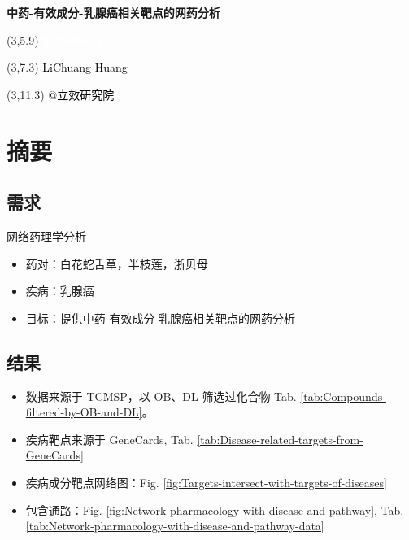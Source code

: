 \documentclass[
]{article}
\author{}
\date{\vspace{-2.5em}}
\providecommand{\tightlist}{%
  \setlength{\itemsep}{0pt}\setlength{\parskip}{0pt}}
\begin{document}
\begin{titlepage} 
\begin{center} \textbf{\Huge
中药-有效成分-乳腺癌相关靶点的网药分析}
\vspace{4em} \begin{textblock}{10}(3,5.9) \huge
\textbf{\textcolor{white}{2024-04-17}}
\end{textblock} \begin{textblock}{10}(3,7.3)
\Large \textcolor{black}{LiChuang Huang}
\end{textblock} \begin{textblock}{10}(3,11.3)
\Large \textcolor{black}{@立效研究院}
\end{textblock} \end{center} \end{titlepage}
\restoregeometry


\tableofcontents

\listoffigures

\listoftables

\newpage


\hypertarget{abstract}{%
\section{摘要}\label{abstract}}

\hypertarget{ux9700ux6c42}{%
\subsection{需求}\label{ux9700ux6c42}}

网络药理学分析

\begin{itemize}
\tightlist
\item
  药对：白花蛇舌草，半枝莲，浙贝母
\item
  疾病：乳腺癌
\item
  目标：提供中药-有效成分-乳腺癌相关靶点的网药分析
\end{itemize}

\hypertarget{ux7ed3ux679c}{%
\subsection{结果}\label{ux7ed3ux679c}}

\begin{itemize}
\tightlist
\item
  数据来源于 TCMSP，以 OB、DL 筛选过化合物 Tab. \ref{tab:Compounds-filtered-by-OB-and-DL}。
\item
  疾病靶点来源于 GeneCards, Tab. \ref{tab:Disease-related-targets-from-GeneCards}
\item
  疾病成分靶点网络图：Fig. \ref{fig:Targets-intersect-with-targets-of-diseases}
\item
  包含通路：Fig. \ref{fig:Network-pharmacology-with-disease-and-pathway},
  Tab. \ref{tab:Network-pharmacology-with-disease-and-pathway-data}
\end{itemize}
\end{document}
